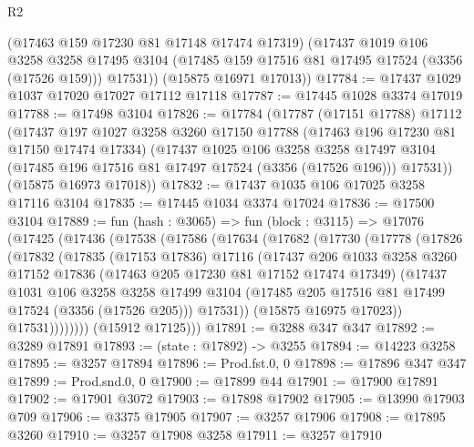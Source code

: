 \begin{lexlean}{R2}
\begin{coremodule}
        (@17463 @159 @17230 @81 @17148 @17474 @17319)
        (@17437
          @1019
          @106
          @3258
          @3258
          @17495
          @3104
          (@17485 @159 @17516 @81 @17495 @17524 (@3356 (@17526 @159)))
          @17531))
      (@15875 @16971 @17013))
@17784 := @17437 @1029 @1037 @17020 @17027 @17112 @17118
@17787 := @17445 @1028 @3374 @17019
@17788 := @17498 @3104
@17826 := @17784
    (@17787
      (@17151 @17788)
      @17112
      (@17437
        @197
        @1027
        @3258
        @3260
        @17150
        @17788
        (@17463 @196 @17230 @81 @17150 @17474 @17334)
        (@17437
          @1025
          @106
          @3258
          @3258
          @17497
          @3104
          (@17485 @196 @17516 @81 @17497 @17524 (@3356 (@17526 @196)))
          @17531))
      (@15875 @16973 @17018))
@17832 := @17437 @1035 @106 @17025 @3258 @17116 @3104
@17835 := @17445 @1034 @3374 @17024
@17836 := @17500 @3104
@17889 := fun (hash : @3065) =>
  fun (block : @3115) =>
  @17076
    (@17425
      (@17436
        (@17538
          (@17586
            (@17634
              (@17682
                (@17730
                  (@17778
                    (@17826
                      (@17832
                        (@17835
                          (@17153 @17836)
                          @17116
                          (@17437
                            @206
                            @1033
                            @3258
                            @3260
                            @17152
                            @17836
                            (@17463 @205 @17230 @81 @17152 @17474 @17349)
                            (@17437
                              @1031
                              @106
                              @3258
                              @3258
                              @17499
                              @3104
                              (@17485 @205 @17516 @81 @17499 @17524 (@3356 (@17526 @205)))
                              @17531))
                          (@15875 @16975 @17023))
                        @17531))))))))
        (@15912 @17125)))
@17891 := @3288 @347 @347
@17892 := @3289 @17891
@17893 := (state : @17892) -> @3255
@17894 := @14223 @3258
@17895 := @3257 @17894
@17896 := Prod.fst.{0, 0}
@17898 := @17896 @347 @347
@17899 := Prod.snd.{0, 0}
@17900 := @17899 @44
@17901 := @17900 @17891
@17902 := @17901 @3072
@17903 := @17898 @17902
@17905 := @13990 @17903 @709
@17906 := @3375 @17905
@17907 := @3257 @17906
@17908 := @17895 @3260
@17910 := @3257 @17908 @3258
@17911 := @3257 @17910

\end{coremodule}
\end{lexlean}
